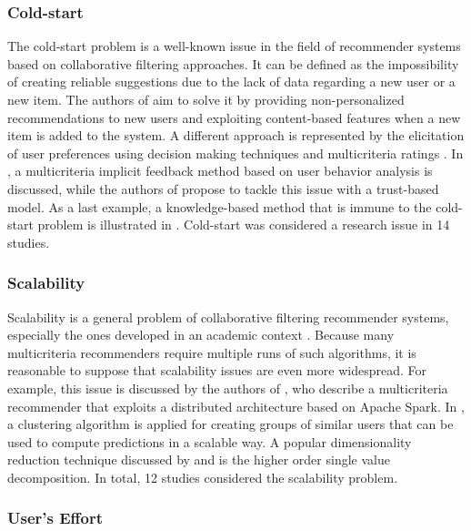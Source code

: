 \subsubsection{Cold-start}
\label{mcr:sec:cold-start}

The cold-start problem is a well-known issue in the field of recommender systems based on collaborative filtering approaches. It can be defined as the impossibility of creating reliable suggestions due to the lack of data regarding a new user or a new item. The authors of  aim to solve it by providing non-personalized recommendations to new users and exploiting content-based features when a new item is added to the system. A different approach is represented by the elicitation of user preferences using decision making techniques and multicriteria ratings . In , a multicriteria implicit feedback method based on user behavior analysis is discussed, while the authors of  propose to tackle this issue with a trust-based model. As a last example, a knowledge-based method that is immune to the cold-start problem is illustrated in . Cold-start was considered a research issue in 14 studies.  

\subsubsection{Scalability}
\label{mcr:sec:scalability}

Scalability is a general problem of collaborative filtering recommender systems, especially  the ones developed in an academic context . Because many multicriteria recommenders require multiple runs of such algorithms, it is reasonable to suppose that scalability issues are even more widespread. For example, this issue is discussed by the authors of , who describe a multicriteria recommender that exploits a distributed architecture based on Apache Spark. In , a clustering algorithm is applied for creating groups of similar users that can be used to compute predictions in a scalable way. A popular dimensionality reduction technique discussed by  and  is the higher order single value decomposition. In total, 12 studies considered the scalability problem.

\subsubsection{User's Effort}

